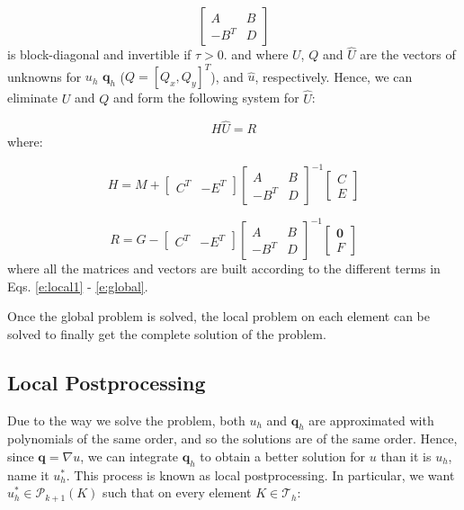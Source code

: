 \documentclass[10pt,a4paper]{article}
\begin{document}
\begin{equation}
	\begin{bmatrix}
		A & B \\
		-B^T & D
	\end{bmatrix}
\end{equation}
is block-diagonal and invertible if $\tau > 0$. and where $U$, $Q$ and $\hat{U}$ are the vectors of
unknowns for $u_h$ $\mathbf{q}_h$ ($Q = [Q_x,Q_y]^T$), and $\hat{u}$, respectively.  
Hence, we can eliminate $U$ and $Q$ and form the following system for $\hat{U}$:

\begin{equation}
	H\hat{U}=R
\end{equation}
where:

\begin{equation}
	H 
	=
	M 
	+ 
	\begin{bmatrix}
		C^T & -E^T
	\end{bmatrix}
	\begin{bmatrix}
		A & B \\
		-B^T & D
	\end{bmatrix}^{-1}
	\begin{bmatrix}
		C \\
		E
	\end{bmatrix}
\end{equation}

\begin{equation}
	R
	=
	G 
	-
	\begin{bmatrix}
		C^T & -E^T
	\end{bmatrix}
	\begin{bmatrix}
		A & B \\
		-B^T & D
	\end{bmatrix}^{-1}
	\begin{bmatrix}
		\mathbf{0} \\
		F
	\end{bmatrix}
\end{equation}
where all the matrices and vectors are built according to the different terms in 
Eqs. \ref{e:local1} - \ref{e:global}.

Once the global problem is solved, the local problem on each element can be solved to finally get the complete solution of the problem.
\subsection*{Local Postprocessing}

Due to the way we solve the problem, both $u_h$ and $\mathbf{q}_h$ are approximated with polynomials of the same order, and so the solutions are of the same order. Hence, since $\mathbf{q} = \nabla u$, we can
integrate $\mathbf{q}_h$ to obtain a better solution for $u$ than it is $u_h$, name it $u^*_h$. This process is known as local postprocessing. In particular, we want
$u^*_h \in \mathcal{P}_{k+1}(K)$ such that on every element $K \in \mathcal{T}_h$:
\end{document}
